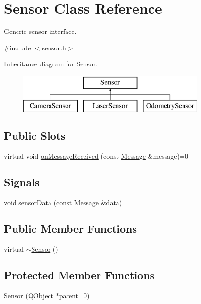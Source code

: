 \hypertarget{classSensor}{
\section{Sensor Class Reference}
\label{classSensor}
}


Generic sensor interface.  




{\ttfamily \#include $<$sensor.h$>$}

Inheritance diagram for Sensor:\begin{figure}[H]
\begin{center}
\leavevmode
\includegraphics[height=2.000000cm]{classSensor}
\end{center}
\end{figure}
\subsection*{Public Slots}
\begin{DoxyCompactItemize}
\item 
virtual void \hyperlink{classSensor_a71fbeb7fbebe8813ad74c57e45c066bc}{onMessageReceived} (const \hyperlink{classMessage}{Message} \&message)=0
\end{DoxyCompactItemize}
\subsection*{Signals}
\begin{DoxyCompactItemize}
\item 
void \hyperlink{classSensor_a776d00dfa555b5a0b1b937c84d767bf4}{sensorData} (const \hyperlink{classMessage}{Message} \&data)
\end{DoxyCompactItemize}
\subsection*{Public Member Functions}
\begin{DoxyCompactItemize}
\item 
virtual \hyperlink{classSensor_aee8c70e7ef05ce65e7ee33686b5d7db2}{$\sim$Sensor} ()
\end{DoxyCompactItemize}
\subsection*{Protected Member Functions}
\begin{DoxyCompactItemize}
\item 
\hyperlink{classSensor_a7106654826948a6a6d76eeb37693657d}{Sensor} (QObject $\ast$parent=0)
\end{DoxyCompactItemize}


